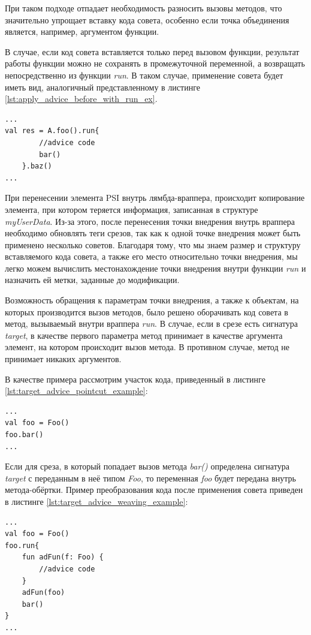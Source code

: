 При таком подходе отпадает необходимость разносить вызовы методов, что
значительно упрощает вставку кода совета, особенно если точка объединения
является, например, аргументом функции.

В случае, если код совета вставляется только перед вызовом функции, результат
работы функции можно не сохранять в промежуточной переменной, а возвращать
непосредственно из функции \textit{run}.
В таком случае, применение совета будет иметь вид, аналогичный представленному
в листинге \ref{lst:apply_advice_before_with_run_ex}.
\begin{lstlisting}[label=lst:apply_advice_before_with_run_ex,
    caption={Пример внедрения кода совета после точки объединения с использованием функции run}]
...
val res = A.foo().run{
        //advice code
        bar()
    }.baz()
...
\end{lstlisting}

При перенесении элемента PSI внутрь лямбда-враппера, происходит копирование
элемента, при котором теряется информация, записанная в структуре
\textit{myUserData}.
Из-за этого, после перенесения точки внедрения внутрь враппера необходимо
обновлять теги срезов, так как к одной точке внедрения может быть применено
несколько советов.
Благодаря тому, что мы знаем размер и структуру вставляемого кода совета, а
также его место относительно точки внедрения, мы легко можем вычислить
местонахождение точки внедрения внутри функции \textit{run} и назначить ей
метки, заданные до модификации.

Возможность обращения к параметрам точки внедрения, а также к объектам, на
которых производится вызов методов, было решено оборачивать код совета в метод,
вызываемый внутри враппера \textit{run}.
В случае, если в срезе есть сигнатура \textit{target}, в качестве первого параметра метод принимает в качестве аргумента элемент, на котором происходит вызов метода.
В противном случае, метод не принимает никаких аргументов.

В качестве примера рассмотрим участок кода, приведенный в листинге
\ref{lst:target_advice_pointcut_example}:
\begin{lstlisting}[label=lst:target_advice_pointcut_example,
    caption={Пример точки внедрения}]
...
val foo = Foo()
foo.bar()
...
\end{lstlisting}
Если для среза, в который попадает вызов метода \textit{bar()} определена
сигнатура \textit{target} с переданным в неё типом \textit{Foo}, то переменная
\textit{foo} будет передана внутрь метода-обёртки.
Пример преобразования кода после применения совета приведен в листинге
\ref{lst:target_advice_weaving_example}:
\begin{lstlisting}[label=lst:target_advice_weaving_example,
    caption={Пример применения совета, имеющего сигнатуру \textit{target}}]
...
val foo = Foo()
foo.run{
	fun adFun(f: Foo) {
		//advice code
	}
	adFun(foo)
	bar()
}
...
\end{lstlisting}

